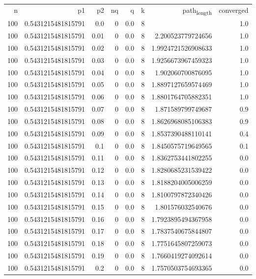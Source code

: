 \documentclass[11pt]{article}
\begin{document}
\begin{center}
\begin{tabular}{rrrrrrrr}
n & p1 & p2 & nq & q & k & path\textsubscript{length} & converged\\
100 & 0.5431215481815791 & 0.0 & 0 & 0.0 & 8 &  & 1.0\\
100 & 0.5431215481815791 & 0.01 & 0 & 0.0 & 8 & 2.200523779724656 & 1.0\\
100 & 0.5431215481815791 & 0.02 & 0 & 0.0 & 8 & 1.9924721526908633 & 1.0\\
100 & 0.5431215481815791 & 0.03 & 0 & 0.0 & 8 & 1.9256673967459323 & 1.0\\
100 & 0.5431215481815791 & 0.04 & 0 & 0.0 & 8 & 1.902060700876095 & 1.0\\
100 & 0.5431215481815791 & 0.05 & 0 & 0.0 & 8 & 1.8897127659574469 & 1.0\\
100 & 0.5431215481815791 & 0.06 & 0 & 0.0 & 8 & 1.8801764705882351 & 1.0\\
100 & 0.5431215481815791 & 0.07 & 0 & 0.0 & 8 & 1.871589799749687 & 0.9\\
100 & 0.5431215481815791 & 0.08 & 0 & 0.0 & 8 & 1.8626968085106383 & 0.9\\
100 & 0.5431215481815791 & 0.09 & 0 & 0.0 & 8 & 1.8537390488110141 & 0.4\\
100 & 0.5431215481815791 & 0.1 & 0 & 0.0 & 8 & 1.8450575719649565 & 0.1\\
100 & 0.5431215481815791 & 0.11 & 0 & 0.0 & 8 & 1.8362753441802255 & 0.0\\
100 & 0.5431215481815791 & 0.12 & 0 & 0.0 & 8 & 1.8280685231539422 & 0.0\\
100 & 0.5431215481815791 & 0.13 & 0 & 0.0 & 8 & 1.8188204005006259 & 0.0\\
100 & 0.5431215481815791 & 0.14 & 0 & 0.0 & 8 & 1.8100797872340426 & 0.0\\
100 & 0.5431215481815791 & 0.15 & 0 & 0.0 & 8 & 1.801576032540676 & 0.0\\
100 & 0.5431215481815791 & 0.16 & 0 & 0.0 & 8 & 1.7923895494367958 & 0.0\\
100 & 0.5431215481815791 & 0.17 & 0 & 0.0 & 8 & 1.7837540675844807 & 0.0\\
100 & 0.5431215481815791 & 0.18 & 0 & 0.0 & 8 & 1.7751645807259073 & 0.0\\
100 & 0.5431215481815791 & 0.19 & 0 & 0.0 & 8 & 1.7660419274092614 & 0.0\\
100 & 0.5431215481815791 & 0.2 & 0 & 0.0 & 8 & 1.7570503754693365 & 0.0\\

\end{tabular}
\end{center}
\end{document}
